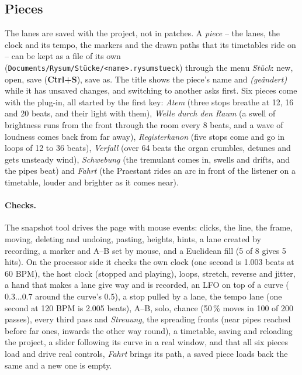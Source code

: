 \documentclass[11pt,a4paper,parskip=half,DIV=11,toc=bibliography]{scrartcl}
\newcommand{\ui}[1]{\emph{#1}}                 %
\newcommand{\fn}[1]{\mbox{\texttt{#1}}}
\begin{document}
\subsection{Pieces}
The lanes are saved with the project, not in patches. A \emph{piece} -- the lanes, the clock and its tempo, the markers and the drawn paths that its
timetables ride on -- can be kept as a file of its own (\fn{Documents/Rysum/Stücke/<name>.rysumstueck}) through the menu \ui{Stück}: new, open, save
(\textbf{Ctrl+S}), save as. The title shows the piece's name and \ui{(geändert)} while it has unsaved changes, and switching to another asks first. Six
pieces come with the plug-in, all started by the first key: \ui{Atem} (three stops breathe at 12, 16 and 20 beats, and their light with them),
\ui{Welle durch den Raum} (a swell of brightness runs from the front through the room every 8 beats, and a wave of loudness comes back from far away),
\ui{Registerkanon} (five stops come and go in loops of 12 to 36 beats), \ui{Verfall} (over 64 beats the organ crumbles, detunes and gets unsteady
wind), \ui{Schwebung} (the tremulant comes in, swells and drifts, and the pipes beat) and \ui{Fahrt} (the Praestant rides an arc in front of the listener
on a timetable, louder and brighter as it comes near).

\paragraph{Checks.} The snapshot tool drives the page with mouse events: clicks, the line, the frame, moving, deleting and undoing, pasting, heights,
hints, a lane created by recording, a marker and A--B set by mouse, and a Euclidean fill (5 of 8 gives 5 hits). On the processor side it checks the own
clock (one second is 1.003 beats at 60 BPM), the host clock (stopped and playing), loops, stretch, reverse and jitter, a hand
that makes a lane give way and is recorded, an LFO on top of a curve ($0.3\dots0.7$ around the curve's 0.5), a stop pulled by a lane, the tempo lane
(one second at 120 BPM is 2.005 beats), A--B, solo, chance (50\,\% moves in 100 of 200 passes), every third pass and \ui{Streuung}, the spreading
fronts (near pipes reached before far ones, inwards the other way round), a timetable, saving and reloading the project, a slider following its curve in
a real window, and that all six pieces load and drive real controls, \ui{Fahrt} brings its path, a saved piece loads back the same and a new one is empty.

\end{document}
